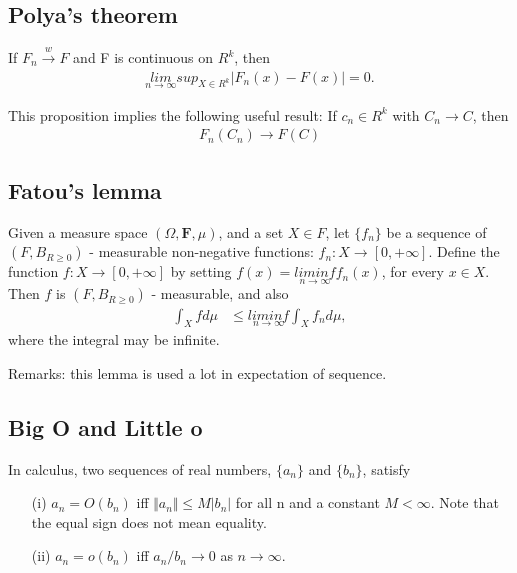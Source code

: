 \subsection{Polya's theorem}

If $F_n \xrightarrow {w} F$ and F is continuous on $R^{k}$, then
 \begin{align*}
	\underset{n \rightarrow \infty}{lim}  sup_{X \in R^k} |F_n(x) - F(x)| = 0.
\end{align*}

This proposition implies the following useful result:
If $c_n \in R^{k}$ with $C_n \rightarrow C$, then
 \begin{align*}
   F_n(C_n) \rightarrow F(C)
\end{align*}

\subsection{Fatou's lemma}

Given a measure space $(\Omega, \mathbf{F}, \mu)$, and a set $X \in F$, let $\{f_n \}$ be a sequence of $(F, B_{R \geq 0})$ - measurable non-negative functions:
$f_n: X \rightarrow [0, + \infty]$. Define the function $f: X \rightarrow [0, + \infty]$ by setting $f(x) = \underset{n \rightarrow \infty}{lim inf} f_n(x)$, for every $x \in X$.
Then $f$ is $(F, B_{R \geq 0})$ - measurable, and also 
 \begin{align*}
   \int_X f d\mu & \leq \underset{n \rightarrow \infty}{lim inf} \int_X f_n d\mu, 
\end{align*}
where the integral may be infinite.

Remarks: this lemma is used a lot in expectation of sequence.

\subsection{Big O and Little o}

In calculus, two sequences of real numbers, $\{ a_n\}$ and $\{b_n\}$, satisfy 
\begin{itemize}

\item[(i)] $a_n = O(b_n)$ iff $ \Vert a_n \Vert \leq M | b_n |$ for all n and a constant $M < \infty$.
Note that the equal sign does not mean equality.

\item[(ii)] $a_n = o(b_n)$ iff $a_n/b_n \rightarrow 0$ as $n \rightarrow \infty$.

\end{itemize}

